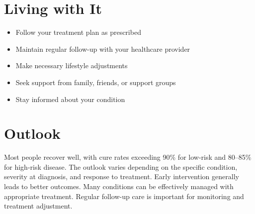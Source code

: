 \section{Living with It}
\begin{itemize}[noitemsep]
  \item Follow your treatment plan as prescribed
  \item Maintain regular follow-up with your healthcare provider
  \item Make necessary lifestyle adjustments
  \item Seek support from family, friends, or support groups
  \item Stay informed about your condition
\end{itemize}
\section{Outlook}
Most people recover well, with cure rates exceeding 90\% for low-risk and 80--85\% for high-risk disease. The outlook varies depending on the specific condition, severity at diagnosis, and response to treatment. Early intervention generally leads to better outcomes. Many conditions can be effectively managed with appropriate treatment. Regular follow-up care is important for monitoring and treatment adjustment.

